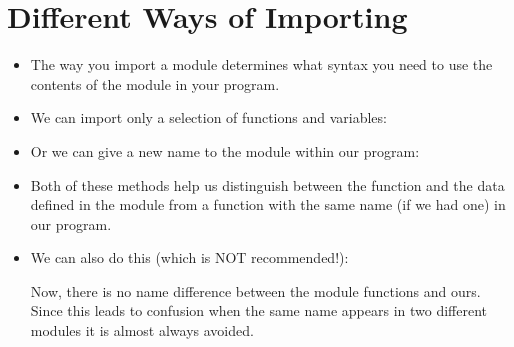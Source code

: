 \documentclass[letterpaper,10pt,english]{sphinxmanual}
\begin{document}
\section{Different Ways of Importing}
\label{\detokenize{lecture_notes/lec04_modules_functions1:different-ways-of-importing}}\begin{itemize}
\item {} 
The way you import a module determines what syntax you need to use
the contents of the module in your program.

\item {} 
We can import only a selection of functions and variables:

\begin{sphinxVerbatim}[commandchars=\\\{\}]
    
\end{sphinxVerbatim}

\item {} 
Or we can give a new name to the module within our program:

\begin{sphinxVerbatim}[commandchars=\\\{\}]
   
\end{sphinxVerbatim}

\item {} 
Both of these methods help us distinguish between the function
 and the data  defined in the  module from a
function with the same name (if we had one) in our program.

\item {} 
We can also do this (which is NOT recommended!):

\begin{sphinxVerbatim}[commandchars=\\\{\}]
   
\end{sphinxVerbatim}

Now, there is no name difference between the  module functions
and ours. Since this leads to confusion when the same name appears
in two different modules it is almost always avoided.

\end{itemize}
\end{document}
